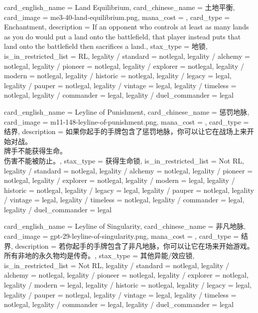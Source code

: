 \documentclass[lang = cn, color = black, 10pt]{AllThatStax}
\begin{document}
\card
{
	card_english_name = {Land Equilibrium},
	card_chinese_name = {土地平衡},
	card_image = me3-40-land-equilibrium.png,
	mana_cost = ,
	card_type = Enchantment,
	description = {If an opponent who controls at least as many lands as you do would put a land onto the battlefield, that player instead puts that land onto the battlefield then sacrifices a land.},
	stax_type = 地锁,
	is_in_restricted_list = RL,
	legality / standard = notlegal,
	legality / alchemy = notlegal,
	legality / pioneer = notlegal,
	legality / explorer = notlegal,
	legality / modern = notlegal,
	legality / historic = notlegal,
	legality / legacy = legal,
	legality / pauper = notlegal,
	legality / vintage = legal,
	legality / timeless = notlegal,
	legality / commander = legal,
	legality / duel_commander = legal
}

\card
{
	card_english_name = {Leyline of Punishment},
	card_chinese_name = {惩罚地脉},
	card_image = m11-148-leyline-of-punishment.png,
	mana_cost = ,
	card_type = 结界,
	description = {如果你起手的手牌包含了惩罚地脉，你可以让它在战场上来开始对战。\\
		牌手不能获得生命。\\
		伤害不能被防止。},
	stax_type = 获得生命锁,
	is_in_restricted_list = Not RL,
	legality / standard = notlegal,
	legality / alchemy = notlegal,
	legality / pioneer = notlegal,
	legality / explorer = notlegal,
	legality / modern = legal,
	legality / historic = notlegal,
	legality / legacy = legal,
	legality / pauper = notlegal,
	legality / vintage = legal,
	legality / timeless = notlegal,
	legality / commander = legal,
	legality / duel_commander = legal
}

\card
{
	card_english_name = {Leyline of Singularity},
	card_chinese_name = {非凡地脉},
	card_image = gpt-29-leyline-of-singularity.png,
	mana_cost = ,
	card_type = 结界,
	description = {若你起手的手牌包含了非凡地脉，你可以让它在场来开始游戏。\\
		所有非地的永久物均是传奇。},
	stax_type = 其他异能/效应锁,
	is_in_restricted_list = Not RL,
	legality / standard = notlegal,
	legality / alchemy = notlegal,
	legality / pioneer = notlegal,
	legality / explorer = notlegal,
	legality / modern = legal,
	legality / historic = notlegal,
	legality / legacy = legal,
	legality / pauper = notlegal,
	legality / vintage = legal,
	legality / timeless = notlegal,
	legality / commander = legal,
	legality / duel_commander = legal
}
\end{document}
